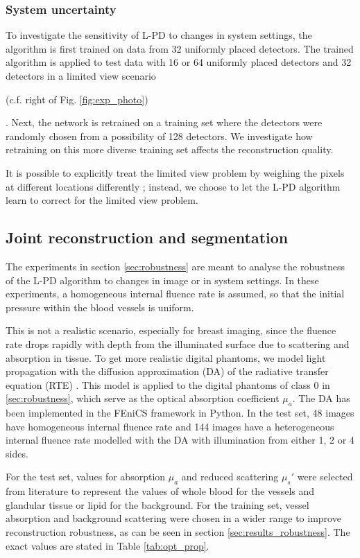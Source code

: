 \documentclass[journal]{IEEEtran}
\newcommand{\hl}[1]{\cbcolor{red}\begin{changebar}{#1}\end{changebar}}
\begin{document}
\subsubsection{System uncertainty}\label{sec:system_uncertainty}
To investigate the sensitivity of L-PD to changes in system settings, the algorithm is first trained on data from 32 uniformly placed detectors. The trained algorithm is applied to test data with 16 or 64 uniformly placed detectors and 32 detectors in a limited view scenario \hl{(c.f. right of Fig. \ref{fig:exp_photo})}. Next, the network is retrained on a training set where the detectors were randomly chosen from a possibility of 128 detectors. We investigate how retraining on this more diverse training set affects the reconstruction quality. \hl{It is possible to explicitly treat the limited view problem by weighing the pixels at different locations differently \cite{Paltauf2007,Schwab2018}; instead, we choose to let the L-PD algorithm learn to correct for the limited view problem.}

\subsection{Joint reconstruction and segmentation}\label{sec:segmentation}
The experiments in section \ref{sec:robustness} are meant to analyse the robustness of the L-PD algorithm to changes in image or in system settings. In these experiments, a homogeneous internal fluence rate is assumed, so that the initial pressure within the blood vessels is uniform. 

This is not a realistic scenario, especially for breast imaging, since the fluence rate drops rapidly with depth from the illuminated surface due to scattering and absorption in tissue. To get more realistic digital phantoms, we model light propagation with the diffusion approximation (DA) of the radiative transfer equation (RTE) \cite{Schweiger1993}. This model is applied to the digital phantoms of class 0 in \ref{sec:robustness}, which serve as the optical absorption coefficient $\mu_a$. The DA has been implemented in the FEniCS framework \cite{Alnaes2014} in Python. In the test set, 48 images have homogeneous internal fluence rate and 144 images have a heterogeneous internal fluence rate modelled with the DA with illumination from either 1, 2 or 4 sides. 

For the test set, values for absorption $\mu_a$ and reduced scattering $\mu_s'$ were selected from literature \cite{Jacques2013} to represent the values of whole blood for the vessels and glandular tissue or lipid for the background. For the training set, vessel absorption and background scattering were chosen in a wider range to improve reconstruction robustness, as can be seen in section \ref{sec:results_robustness}. The exact values are stated in Table \ref{tab:opt_prop}.
\end{document}
